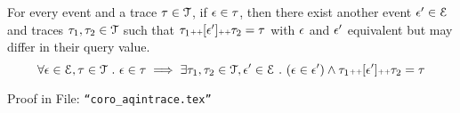 %
\begin{coro}
\label{coro:aqintrace}
For every event and a trace $\mathtt{\tau} \in \mathcal{T}$,
if $\mathtt{\epsilon} \in \mathtt{\tau}$, 
then there exist another event $\mathtt{\epsilon}' \in \mathcal{E}$ and traces $\mathtt{\tau}_1, \mathtt{\tau}_2 \in \mathcal{T}$
such that $\mathtt{\tau}_1 {\scriptscriptstyle ++} [\mathtt{\epsilon}'] {\scriptscriptstyle ++} \mathtt{\tau}_2 = \mathtt{\tau} $
with 
$\mathtt{\epsilon}$ and $\mathtt{\epsilon}'$ equivalent but may differ in their query value.
\[
  \forall \mathtt{\epsilon} \in \mathcal{E}, \mathtt{\tau} \in \mathcal{T} ~.~
\mathtt{\epsilon} \in \mathtt{\tau} \implies \exists \mathtt{\tau}_1, \mathtt{\tau}_2 \in \mathcal{T}, 
\mathtt{\epsilon}' \in \mathcal{E} ~.~ (\mathtt{\epsilon} \in \mathtt{\epsilon}') \land \mathtt{\tau}_1 {\scriptscriptstyle ++} [\mathtt{\epsilon}'] {\scriptscriptstyle ++} \mathtt{\tau}_2 = \mathtt{\tau}  
\]
\end{coro}
\begin{subproof}
Proof in File: {\tt ``coro\_aqintrace.tex''}
% 
%
\end{subproof}
